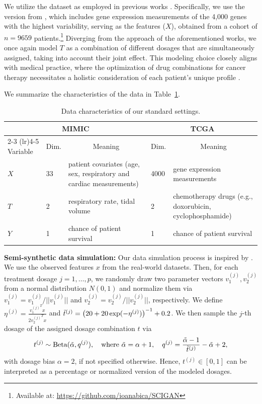 We utilize the dataset as employed in previous works \cite{Bica.2020c, Schwab.2020}. Specifically, we use the version from \cite{Bica.2020c}, which includes gene expression measurements of the 4,000 genes with the highest variability, serving as the features ($X$), obtained from a cohort of $n=9659$ patients.\footnote{Available at: \url{https://github.com/ioanabica/SCIGAN}} Diverging from the approach of the aforementioned works, we once again model $T$ as a combination of different dosages that are simultaneously assigned, taking into account their joint effect. This modeling choice closely aligns with medical practice, where the optimization of drug combinations for cancer therapy necessitates a holistic consideration of each patient's unique profile \cite{Fisusi.2019, Wu.2020b}.

We summarize the characteristics of the data in Table~\ref{tab:data}.

\begin{table}[h!]
    \centering
    \footnotesize
    \begin{tabular}{l lp{1.8in} lp{1.8in} }
    \toprule
          \multicolumn{3}{c}{MIMIC} & \multicolumn{2}{c}{TCGA} \\ 
         \cmidrule(lr){2-3} \cmidrule(lr){4-5}
        Variable & Dim. & \multicolumn{1}{c}{Meaning} & Dim. & \multicolumn{1}{c}{Meaning} \\ 
        \midrule
        $X$ & 33 & patient covariates (age, sex, respiratory and cardiac measurements) & 4000 & gene expression measurements \\ \midrule
        $T$ & 2 & respiratory rate, tidal volume & 2 & chemotherapy drugs (e.g., doxorubicin, cyclophosphamide) \\ \midrule
        $Y$ & 1 & chance of patient survival & 1 & chance of patient survival \\ \bottomrule
    \end{tabular}
    \caption{Data characteristics of our standard settings.}
    \label{tab:data}
\end{table}

\textbf{Semi-synthetic data simulation:} 
Our data simulation process is inspired by \cite{Bica.2020c}. We use the observed features $x$ from the real-world datasets. Then, for each treatment dosage $j = 1, \ldots, p$,  we randomly draw two parameter vectors $v_1^{(j)}, v_2^{(j)}$ from a normal distribution $N(0, 1)$  and normalize them via $v_1^{(j)} = v_1^{(j)}/||v_1^{(j)}||$ and $ v_2^{(j)}=v_2^{(j)}/||v_2^{(j)}||$, respectively. We define $\eta^{(j)} = \frac{{v_1^{(j)}}^{T} x}{ 2  {v_2^{(j)}}^{T} x}$
and $\Tilde{t}^{(j)} = \left(20 + 20 \exp(-\eta^{(j)}) \right)^{-1} +0.2$. We then sample the $j$-th dosage of the assigned dosage combination $t$ via 
\begin{equation} \label{eq:data_GPS}
    t^{(j)} \sim \text{Beta}(\Tilde{\alpha}, q^{(j)}), \quad \text{where } \Tilde{\alpha}=\alpha+1, \quad q^{(j)} = \frac{\Tilde{\alpha}-1}{\Tilde{t}^{(j)}}-\Tilde{\alpha}+2 ,
\end{equation} 
with dosage bias $\alpha=2$, if not specified otherwise. Hence, $t^{(j)} \in [0, 1]$ can be interpreted as a percentage or normalized version of the modeled dosages.

